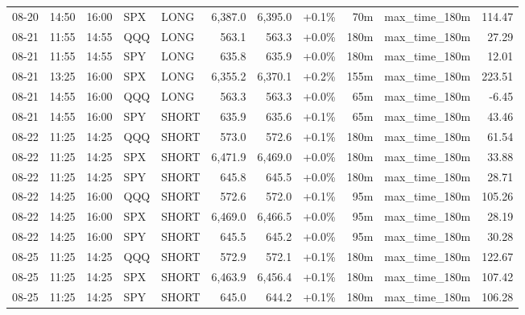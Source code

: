 \documentclass[11pt,a4paper,twoside]{article}
\begin{document}
\begin{center}
\begin{longtable}{>{\color{txtmain}}l l l l l r r r r >{\color{txtmain}}l r}
08-20 & 14:50 & 16:00 & SPX & LONG & 6,387.0 & 6,395.0 & \textcolor{wingreen}{+0.1\%} & 70m & max\_time\_180m & \textcolor{wingreen}{114.47} \\
08-21 & 11:55 & 14:55 & QQQ & LONG & 563.1 & 563.3 & \textcolor{wingreen}{+0.0\%} & 180m & max\_time\_180m & \textcolor{wingreen}{27.29} \\
08-21 & 11:55 & 14:55 & SPY & LONG & 635.8 & 635.9 & \textcolor{wingreen}{+0.0\%} & 180m & max\_time\_180m & \textcolor{wingreen}{12.01} \\
08-21 & 13:25 & 16:00 & SPX & LONG & 6,355.2 & 6,370.1 & \textcolor{wingreen}{+0.2\%} & 155m & max\_time\_180m & \textcolor{wingreen}{223.51} \\
08-21 & 14:55 & 16:00 & QQQ & LONG & 563.3 & 563.3 & \textcolor{wingreen}{+0.0\%} & 65m & max\_time\_180m & \textcolor{lossred}{-6.45} \\
08-21 & 14:55 & 16:00 & SPY & SHORT & 635.9 & 635.6 & \textcolor{wingreen}{+0.1\%} & 65m & max\_time\_180m & \textcolor{wingreen}{43.46} \\
08-22 & 11:25 & 14:25 & QQQ & SHORT & 573.0 & 572.6 & \textcolor{wingreen}{+0.1\%} & 180m & max\_time\_180m & \textcolor{wingreen}{61.54} \\
08-22 & 11:25 & 14:25 & SPX & SHORT & 6,471.9 & 6,469.0 & \textcolor{wingreen}{+0.0\%} & 180m & max\_time\_180m & \textcolor{wingreen}{33.88} \\
08-22 & 11:25 & 14:25 & SPY & SHORT & 645.8 & 645.5 & \textcolor{wingreen}{+0.0\%} & 180m & max\_time\_180m & \textcolor{wingreen}{28.71} \\
08-22 & 14:25 & 16:00 & QQQ & SHORT & 572.6 & 572.0 & \textcolor{wingreen}{+0.1\%} & 95m & max\_time\_180m & \textcolor{wingreen}{105.26} \\
08-22 & 14:25 & 16:00 & SPX & SHORT & 6,469.0 & 6,466.5 & \textcolor{wingreen}{+0.0\%} & 95m & max\_time\_180m & \textcolor{wingreen}{28.19} \\
08-22 & 14:25 & 16:00 & SPY & SHORT & 645.5 & 645.2 & \textcolor{wingreen}{+0.0\%} & 95m & max\_time\_180m & \textcolor{wingreen}{30.28} \\
08-25 & 11:25 & 14:25 & QQQ & SHORT & 572.9 & 572.1 & \textcolor{wingreen}{+0.1\%} & 180m & max\_time\_180m & \textcolor{wingreen}{122.67} \\
08-25 & 11:25 & 14:25 & SPX & SHORT & 6,463.9 & 6,456.4 & \textcolor{wingreen}{+0.1\%} & 180m & max\_time\_180m & \textcolor{wingreen}{107.42} \\
08-25 & 11:25 & 14:25 & SPY & SHORT & 645.0 & 644.2 & \textcolor{wingreen}{+0.1\%} & 180m & max\_time\_180m & \textcolor{wingreen}{106.28} \\

\end{longtable}
\end{center}
\end{document}
